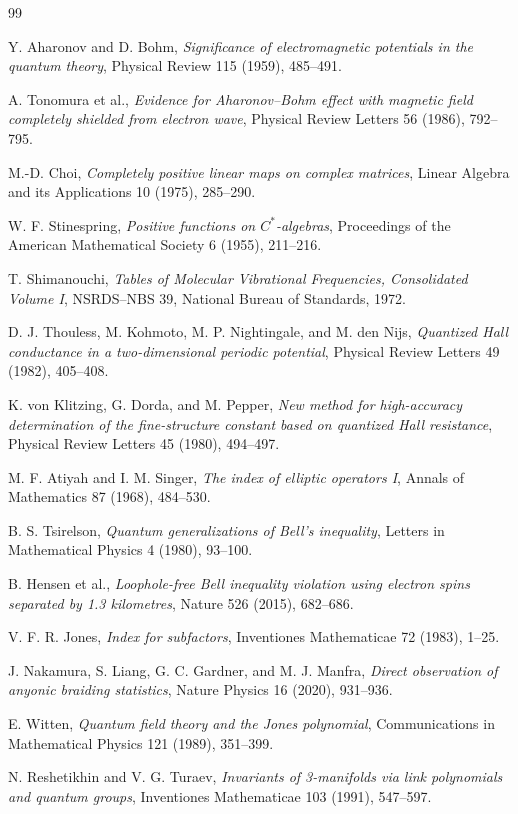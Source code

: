 \begin{thebibliography}{99}

Y. Aharonov and D. Bohm,
\emph{Significance of electromagnetic potentials in the quantum theory},
Physical Review 115 (1959), 485--491.

A. Tonomura et al.,
\emph{Evidence for Aharonov--Bohm effect with magnetic field completely
shielded from electron wave},
Physical Review Letters 56 (1986), 792--795.

M.-D. Choi,
\emph{Completely positive linear maps on complex matrices},
Linear Algebra and its Applications 10 (1975), 285--290.

W. F. Stinespring,
\emph{Positive functions on $C^*$-algebras},
Proceedings of the American Mathematical Society 6 (1955), 211--216.

T. Shimanouchi,
\emph{Tables of Molecular Vibrational Frequencies, Consolidated Volume I},
NSRDS--NBS 39, National Bureau of Standards, 1972.

D. J. Thouless, M. Kohmoto, M. P. Nightingale, and M. den Nijs,
\emph{Quantized Hall conductance in a two-dimensional periodic potential},
Physical Review Letters 49 (1982), 405--408.

K. von Klitzing, G. Dorda, and M. Pepper,
\emph{New method for high-accuracy determination of the fine-structure
constant based on quantized Hall resistance},
Physical Review Letters 45 (1980), 494--497.

M. F. Atiyah and I. M. Singer,
\emph{The index of elliptic operators I},
Annals of Mathematics 87 (1968), 484--530.

B. S. Tsirelson,
\emph{Quantum generalizations of Bell's inequality},
Letters in Mathematical Physics 4 (1980), 93--100.

B. Hensen et al.,
\emph{Loophole-free Bell inequality violation using electron spins separated
by 1.3 kilometres}, Nature 526 (2015), 682--686.

V. F. R. Jones,
\emph{Index for subfactors},
Inventiones Mathematicae 72 (1983), 1--25.

J. Nakamura, S. Liang, G. C. Gardner, and M. J. Manfra,
\emph{Direct observation of anyonic braiding statistics},
Nature Physics 16 (2020), 931--936.

E. Witten,
\emph{Quantum field theory and the Jones polynomial},
Communications in Mathematical Physics 121 (1989), 351--399.

N. Reshetikhin and V. G. Turaev,
\emph{Invariants of 3-manifolds via link polynomials and quantum groups},
Inventiones Mathematicae 103 (1991), 547--597.

\end{thebibliography}
